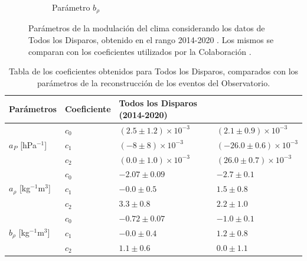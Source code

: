 \begin{figure}[H]
\begin{subfigure}[b]{\textwidth}
  \caption{Parámetro  $b_\rho$   }
  \end{subfigure}
  \caption{Parámetros de la modulación del clima considerando los datos de Todos los Disparos, obtenido en el rango 2014-2020 . Los mismos se comparan con los coeficientes utilizados por la Colaboración \cite{aab2017impact}.}
  \label{fig:ALL-params}
\end{figure}

\begin{table}[H]
  \centering
  \begin{tabular}{l|l|l|l}
       Parámetros									& Coeficiente		& Todos los Disparos (2014-2020)	                  & \cite{aab2017impact}	\\ \hline \hline
   \multirow{3}{*}{$a_P$ [hPa$^{-1}$]}  			    &  $c_0$			& $( 2.5\pm 1.2)\times 10^{-3}$	& $( 2.1 \pm 0.9)\times 10^{-3} $	\\ \cline{2-4} %
                                                  &  $c_1$			& $(-8 \pm 8)\times 10^{-3}$	& $(-26.0 \pm 0.6 )\times 10^{-3}$	\\ \cline{2-4} 
                                                  &  $c_2$			& $( 0.0\pm 1.0)\times 10^{-3}$	& $( 26.0 \pm 0.7 )\times 10^{-3}$	\\ \hline \hline%
  
   \multirow{3}{*}{$a_\rho$ [kg$^{-1}$m$^3$]}  	  &  $c_0$			& $-2.07   \pm 0.09$	            & $ -2.7  \pm 0.1  $\\ \cline{2-4} 
                                                  &  $c_1$			& $-0.0    \pm 0.5 $	            & $ 1.5   \pm 0.8  $\\ \cline{2-4} 
                                                  &  $c_2$			& $ 3.3    \pm 0.8 $	            & $ 2.2   \pm 1.0  $\\ \hline \hline%
  
  \multirow{3}{*}{$b_\rho$ [kg$^{-1}$m$^3$]} 		  &  $c_0$			& $-0.72   \pm 0.07$		            & $-1.0   \pm 0.1 $	\\ \cline{2-4} 
                                                  &  $c_1$			& $-0.0    \pm 0.4$		            & $ 1.2   \pm 0.8  $	\\ \cline{2-4} 
                                                  &  $c_2$			& $ 1.1    \pm 0.6$		            & $ 0.0   \pm 1.1  $	\\ 
  
  \end{tabular}	
  \caption{Tabla de los coeficientes obtenidos para Todos los Disparos, comparados con los parámetros de la reconstrucción de los eventos del Observatorio.} \label{tabla:cuadratica_ALL}
\end{table}


